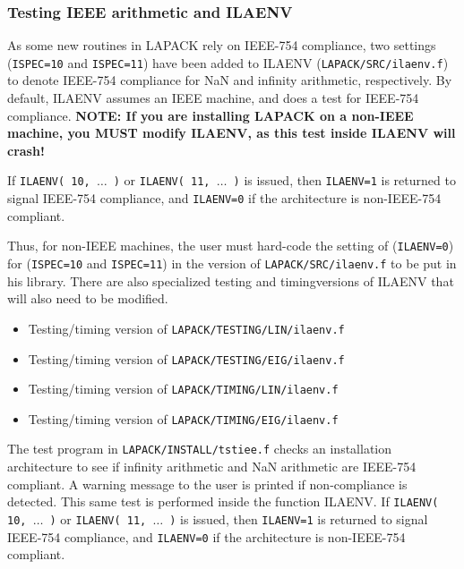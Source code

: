 \documentclass[11pt]{report}
\begin{document}
\subsubsection{Testing IEEE arithmetic and ILAENV}\label{testieee}


As some new routines in LAPACK rely on IEEE-754 compliance,
two settings (\texttt{ISPEC=10} and \texttt{ISPEC=11}) have been added to ILAENV
(\texttt{LAPACK/SRC/ilaenv.f}) to denote IEEE-754 compliance for NaN and
infinity arithmetic, respectively.  By default, ILAENV assumes an IEEE
machine, and does a test for IEEE-754 compliance.  \textbf{NOTE:  If you
are installing LAPACK on a non-IEEE machine, you MUST modify ILAENV,
as this test inside ILAENV will crash!}

If \texttt{ILAENV( 10, $\ldots$ )} or \texttt{ILAENV( 11, $\ldots$ )} is 
issued, then \texttt{ILAENV=1} is returned to signal IEEE-754 compliance,
and \texttt{ILAENV=0} if the architecture is non-IEEE-754 compliant.

Thus, for non-IEEE machines, the user must hard-code the setting of
(\texttt{ILAENV=0}) for (\texttt{ISPEC=10} and \texttt{ISPEC=11}) in the version
of \texttt{LAPACK/SRC/ilaenv.f} to be put in
his library.  There are also specialized testing and timing\footnotemark[\value{footnote}] versions of
ILAENV that will also need to be modified.
\begin{itemize}
\item Testing/timing version of \texttt{LAPACK/TESTING/LIN/ilaenv.f}
\item Testing/timing version of \texttt{LAPACK/TESTING/EIG/ilaenv.f}
\item Testing/timing version of \texttt{LAPACK/TIMING/LIN/ilaenv.f}
\item Testing/timing version of \texttt{LAPACK/TIMING/EIG/ilaenv.f}
\end{itemize}


The test program in \texttt{LAPACK/INSTALL/tstiee.f} checks an installation
architecture
to see if infinity arithmetic and NaN arithmetic are IEEE-754 compliant.  
A warning message to the user is printed if non-compliance is detected.
This same test is performed inside the function ILAENV.  If
\texttt{ILAENV( 10, $\ldots$ )} or \texttt{ILAENV( 11, $\ldots$ )} is 
issued, then \texttt{ILAENV=1} is returned to signal IEEE-754 compliance,
and \texttt{ILAENV=0} if the architecture is non-IEEE-754 compliant.
\end{document}
